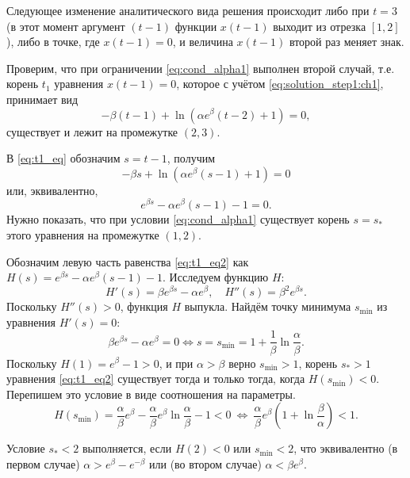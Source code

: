 Следующее изменение аналитического вида решения происходит либо при $t = 3$ (в этот момент аргумент $(t - 1)$ функции $x(t - 1)$ выходит из отрезка $[1, 2]$), либо в точке, где $x(t - 1) = 0$, и величина $x(t - 1)$ второй раз меняет знак.

Проверим, что при ограничении \eqref{eq:cond_alpha1} выполнен второй случай, т.е. корень $t_1$ уравнения $x(t - 1) = 0$, которое с учётом \eqref{eq:solution_step1:ch1}, принимает вид
\begin{equation}
\label{eq:t1_eq}
    -\beta (t - 1) + \ln(\alpha e^{\beta}(t - 2) + 1) = 0,
\end{equation}
существует и лежит на промежутке $(2, 3)$.

В \eqref{eq:t1_eq} обозначим $s = t - 1$, получим
%
$$-\beta s + \ln(\alpha e^{\beta} (s - 1) + 1) = 0$$
%
или, эквивалентно,
%
\begin{equation}
\label{eq:t1_eq2}
e^{\beta s} - \alpha e^{\beta} (s - 1) - 1 = 0.
\end{equation}
Нужно показать, что при условии \eqref{eq:cond_alpha1} существует корень $s = s_*$ этого уравнения на промежутке $(1, 2)$.

Обозначим левую часть равенства \eqref{eq:t1_eq2} как $H(s) = e^{\beta s} - \alpha e^{\beta} (s - 1) - 1$. Исследуем функцию $H$:
%
\[
H'(s) = \beta e^{\beta s} - \alpha e^{\beta}, \quad H''(s) = \beta^2 e^{\beta s}.
\]
%
Поскольку $H''(s) > 0$, функция $H$ выпукла. Найдём точку минимума $s_{\min}$ из уравнения $H'(s) = 0$:
\[
\beta e^{\beta s} - \alpha e^{\beta} = 0 \Leftrightarrow s = s_{\min} = 1 + \frac{1}{\beta}\ln\frac{\alpha}{\beta}.
\]
%
Поскольку $H(1) = e^{\beta} - 1 > 0$, и при $\alpha > \beta$ верно $s_{\min} > 1$, корень $s_* > 1$ уравнения \eqref{eq:t1_eq2} существует тогда и только тогда, когда $H(s_{\min}) < 0$. Перепишем это условие в виде соотношения на параметры.
%
\[
H(s_{\min}) = \frac{\alpha}{\beta}e^{\beta} - \frac{\alpha}{\beta}e^\beta\ln\frac{\alpha}{\beta} - 1 < 0 \ \Leftrightarrow \  \frac{\alpha}{\beta}e^{\beta}\left(1 + \ln\frac{\beta}{\alpha}\right) < 1.
\]

Условие $s_* < 2$ выполняется, если $H(2) < 0$ или $s_{\min} < 2$, что эквивалентно (в первом случае) $\alpha > e^{\beta} - e^{-\beta}$ или (во втором случае) $\alpha < \beta e^{\beta}$.


